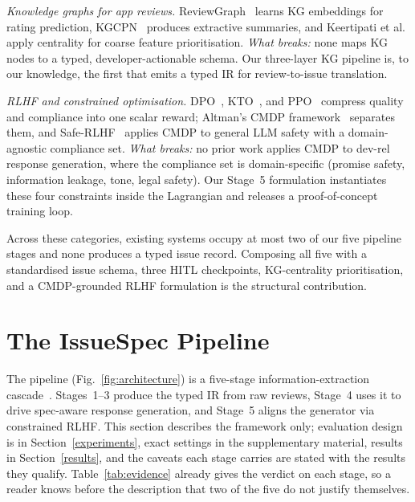 \documentclass[preprint,12pt]{elsarticle}
\begin{document}
\emph{Knowledge graphs for app reviews.} ReviewGraph~\cite{de2025reviewgraph} learns KG embeddings
for rating prediction, KGCPN~\cite{yu2024knowledge} produces extractive summaries, and Keertipati
et al.~\cite{keertipati2016approaches} apply centrality for coarse feature prioritisation.
\emph{What breaks:} none maps KG nodes to a typed, developer-actionable schema. Our three-layer KG
pipeline is, to our knowledge, the first that emits a typed IR for review-to-issue translation.

\emph{RLHF and constrained optimisation.} DPO~\cite{rafailov2023direct},
KTO~\cite{ethayarajh2024kto}, and PPO~\cite{schulman2017proximal} compress quality and compliance
into one scalar reward; Altman's CMDP framework~\cite{altman2021constrained} separates them, and
Safe-RLHF~\cite{dai2024safe} applies CMDP to general LLM safety with a domain-agnostic compliance
set. \emph{What breaks:} no prior work applies CMDP to dev-rel response generation, where the
compliance set is domain-specific (promise safety, information leakage, tone, legal safety). Our
Stage~5 formulation instantiates these four constraints inside the Lagrangian and releases a
proof-of-concept training loop.

Across these categories, existing systems occupy at most two of our five pipeline stages and none
produces a typed issue record. Composing all five with a standardised issue schema, three HITL
checkpoints, KG-centrality prioritisation, and a CMDP-grounded RLHF formulation is the structural
contribution.

\section{The IssueSpec Pipeline}\label{system-design}

The pipeline (Fig.~\ref{fig:architecture}) is a five-stage information-extraction
cascade~\cite{hearst1999untangling, sarawagi2008information}. Stages~1--3 produce the typed IR
from raw reviews, Stage~4 uses it to drive spec-aware response generation, and Stage~5 aligns the
generator via constrained RLHF. This section describes the framework only; evaluation design is
in Section~\ref{experiments}, exact settings in the supplementary material, results in
Section~\ref{results}, and the caveats each stage carries are stated with the results they
qualify. Table~\ref{tab:evidence} already gives the verdict on each stage, so a reader knows
before the description that two of the five do not justify themselves.
\end{document}
